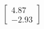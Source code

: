 \documentclass[preview]{standalone}
\begin{document}
\begin{align*}
\begin{bmatrix} 4.87 \\ -2.93 \end{bmatrix}
\end{align*}
\end{document}
